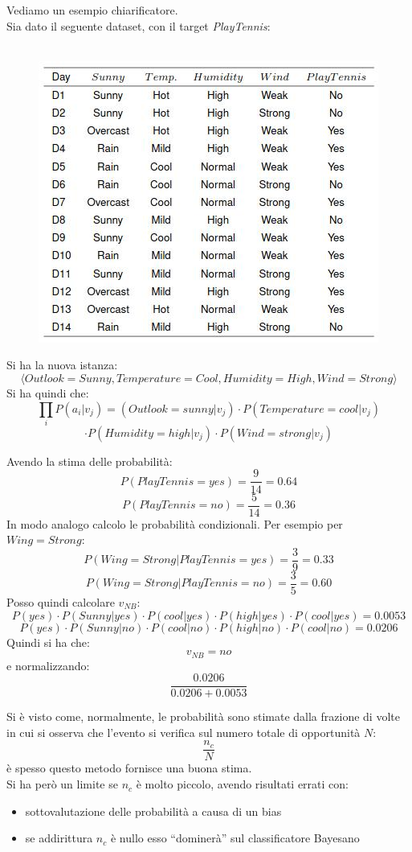 \begin{esempio}
  Vediamo un esempio chiarificatore.\\
  Sia dato il seguente dataset, con il target \textit{PlayTennis}:
  \begin{figure}[H]
    \centering
\    \includegraphics[scale = 0.7]{img/cbn.jpg}
  \end{figure}
  Si ha la nuova istanza:
  \[\langle Outlook=Sunny, Temperature=Cool, Humidity=High,
      Wind=Strong \rangle\]
  Si ha quindi che:
  \[\prod_iP(a_i|v_j)=(Outlook=sunny|v_j)\cdot
      P(Temperature=cool|v_j)\]\[\cdot P(Humidity=high|v_j)\cdot
      P(Wind=strong|v_j)\]
 
  Avendo la stima delle probabilità:
  \[P(PlayTennis=yes)=\frac{9}{14}=0.64\]
  \[P(PlayTennis=no)=\frac{5}{14}=0.36\]
  In modo analogo calcolo le probabilità condizionali. Per esempio per
  $Wing=Strong$:
  \[P(Wing=Strong|PlayTennis=yes)=\frac{3}{9}=0.33\]
  \[P(Wing=Strong|PlayTennis=no)=\frac{3}{5}=0.60\]
  Posso quindi calcolare $v_{NB}$:
  \[P(yes)\cdot P(Sunny|yes)\cdot P(cool|yes)\cdot P(high|yes)\cdot
    P(cool|yes)=0.0053\]
  \[P(yes)\cdot P(Sunny|no)\cdot P(cool|no)\cdot P(high|no)\cdot
    P(cool|no)=0.0206\]
  Quindi si ha che:
  \[v_{NB}=no\]
  e normalizzando:
  \[\frac{0.0206}{0.0206+0.0053}\]
\end{esempio}
Si è visto come, normalmente, le probabilità sono stimate dalla frazione di
volte in cui si osserva che l'evento si verifica sul numero totale di
opportunità $N$:
\[\frac{n_c}{N}\]
è spesso questo metodo fornisce una buona stima.\\
Si ha però un limite se $n_c$ è molto piccolo, avendo risultati errati con:
\begin{itemize}
  \item sottovalutazione delle probabilità a causa di un bias
  \item se addirittura $n_c$ è nullo esso ``dominerà'' sul classificatore
  Bayesano 
\end{itemize}
